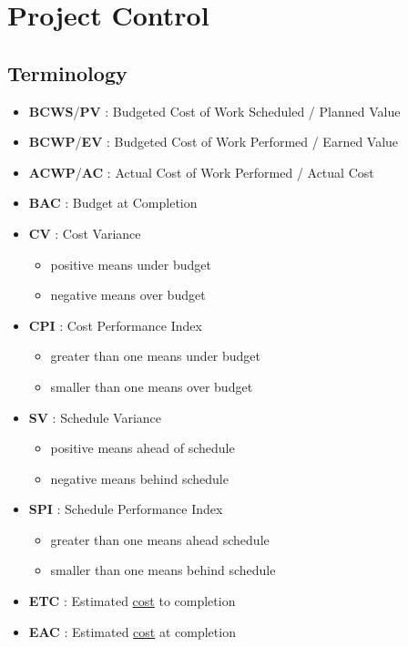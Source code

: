 \documentclass[]{article}
\providecommand{\tightlist}{%
  \setlength{\itemsep}{0pt}\setlength{\parskip}{0pt}}
\begin{document}
\hypertarget{project-control}{%
\section{Project Control}\label{project-control}}

\hypertarget{terminology}{%
\subsection{Terminology}\label{terminology}}

\begin{itemize}
\tightlist
\item
  \textbf{BCWS}/\textbf{PV} : Budgeted Cost of Work Scheduled / Planned
  Value
\item
  \textbf{BCWP}/\textbf{EV} : Budgeted Cost of Work Performed / Earned
  Value
\item
  \textbf{ACWP}/\textbf{AC} : Actual Cost of Work Performed / Actual
  Cost
\item
  \textbf{BAC} : Budget at Completion
\item
  \textbf{CV} : Cost Variance

  \begin{itemize}
  \tightlist
  \item
    positive means under budget
  \item
    negative means over budget
  \end{itemize}
\item
  \textbf{CPI} : Cost Performance Index

  \begin{itemize}
  \tightlist
  \item
    greater than one means under budget
  \item
    smaller than one means over budget
  \end{itemize}
\item
  \textbf{SV} : Schedule Variance

  \begin{itemize}
  \tightlist
  \item
    positive means ahead of schedule
  \item
    negative means behind schedule
  \end{itemize}
\item
  \textbf{SPI} : Schedule Performance Index

  \begin{itemize}
  \tightlist
  \item
    greater than one means ahead schedule
  \item
    smaller than one means behind schedule
  \end{itemize}
\item
  \textbf{ETC} : Estimated \protect\hyperlink{cost}{cost} to completion
\item
  \textbf{EAC} : Estimated \protect\hyperlink{cost}{cost} at completion
\end{itemize}
\end{document}
